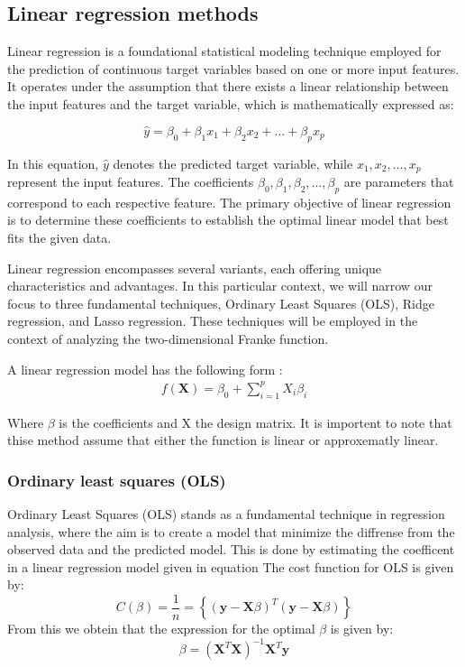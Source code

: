 \thispagestyle{plain}

\subsection{Linear regression methods}

\noindent Linear regression is a foundational statistical modeling technique employed for the prediction of continuous target variables
based on one or more input features. It operates under the assumption that there exists a linear relationship between the input features
and the target variable, which is mathematically expressed as:

\[
\hat{y} = \beta_0 + \beta_1 x_1 + \beta_2 x_2 + \ldots + \beta_p x_p
\]

In this equation, $\hat{y}$ denotes the predicted target variable, while $x_1, x_2, \ldots, x_p$ represent the input features. The 
coefficients $\beta_0, \beta_1, \beta_2, \ldots, \beta_p$ are parameters that correspond to each respective feature. The primary objective 
of linear regression is to determine these coefficients to establish the optimal linear model that best fits the given data.

Linear regression encompasses several variants, each offering unique characteristics and advantages. In this particular context, 
we will narrow our focus to three fundamental techniques, Ordinary Least Squares (OLS), Ridge regression, and Lasso regression. These 
techniques will be employed in the context of analyzing the two-dimensional Franke function. 

A linear regression model has the following form :
\begin{align}
    f(\textbf{X}) = \beta_0 + \sum^{p}_{i=1} X_i \beta_i %
\end{align}

Where $\beta$ is the coefficients and X the design matrix. It is importent to note 
that thise method assume that either the function is linear or approxematly linear.


\subsubsection{Ordinary least squares (OLS)}
\noindent Ordinary Least Squares (OLS) stands as a fundamental technique in regression
analysis, where the aim is to create a model that minimize the diffrense from
the observed data and the predicted model. This is done by estimating the coefficent in a 
linear regression model given in equation %
The cost function for OLS is given by:
\begin{equation}
    C(\beta) = \frac{1}{n} = \left\lbrace ( \textbf{y} - \textbf{X}\beta  )^T (\textbf{y} - \textbf{X}\beta)\right\rbrace
\end{equation}
From this we obtein that the expression for the optimal $\beta$ is given by:
\begin{equation}
    \beta = (\textbf{X}^T \textbf{X})^{-1}\textbf{X}^T \textbf{y}
\end{equation}
